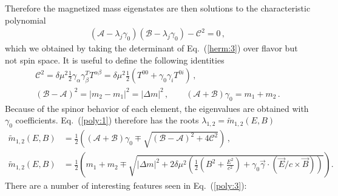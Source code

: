 \documentclass[addchapnum]{ws-rv961x669} %
\newcommand{\req}[1]{Eq.~(\ref{#1})}
\begin{document}
Therefore the magnetized mass eigenstates are then solutions to the characteristic polynomial
\begin{align}
    \label{poly:1}
    (\mathcal{A}-\lambda_{j}\gamma_{0})(\mathcal{B}-\lambda_{j}\gamma_{0})-\mathcal{C}^{2}=0\,,
\end{align}
which we obtained by taking the determinant of \req{herm:3} over flavor but not spin space. It is useful to define the following identities
\begin{align}
    \label{poly:1a}
    \mathcal{C}^{2} = \delta\mu^{2}\frac{1}{2}\gamma_{\alpha}\gamma_{\beta}^{T}T^{\alpha\beta} = 
    \delta\mu^{2}\frac{1}{2}\left(T^{00}+\gamma_{0}\gamma_{i}T^{0i}\right)\,,\\
    (\mathcal{B}-\mathcal{A})^{2} = |m_{2}-m_{1}|^{2} = |\Delta m|^{2}\,,\qquad (\mathcal{A}+\mathcal{B})\gamma_{0} = m_{1} + m_{2}\,.
\end{align}
Because of the spinor behavior of each element, the eigenvalues are obtained with $\gamma_{0}$ coefficients. \req{poly:1} therefore has the roots $\lambda_{1,2} = \widetilde m_{1,2}(E,B)$
\begin{align}
    \label{poly:2}
    \widetilde m_{1,2}(E,B)\! &=\! \frac{1}{2}\left((\mathcal{A}+\mathcal{B})\gamma_{0}\mp\sqrt{(\mathcal{B}-\mathcal{A})^{2}+4\mathcal{C}^{2}}\right)\,,\\
    \label{poly:3}
    \widetilde m_{1,2}(E,B)\! &=\! \frac{1}{2}\left(m_{1}\!+\!m_{2}\!\mp\!\sqrt{|\Delta m|^{2}\!+\!2\delta\mu^{2}\left(\frac{1}{2}\left(B^{2}\!+\!\frac{E^{2}}{c^{2}}\right)\!+\!\gamma_{0}\vec{\gamma}\!\cdot\!(\vec{E}/c\times\vec{B})\right)}\right)\!.
\end{align}
There are a number of interesting features seen in \req{poly:3}:
\end{document}
